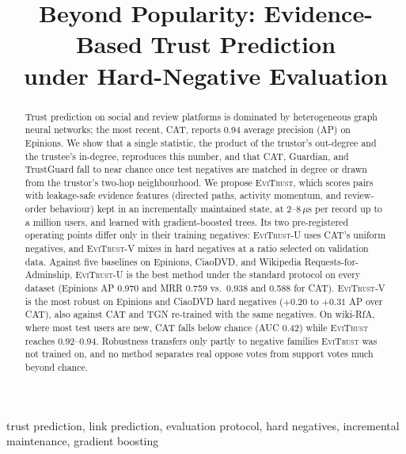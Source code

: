 \documentclass[conference]{IEEEtran}
\newcommand{\evi}{\textsc{EviTrust}}
\newcommand{\eviU}{\textsc{EviTrust}-U}
\newcommand{\eviV}{\textsc{EviTrust}-V}
\begin{document}
\title{Beyond Popularity: Evidence-Based Trust Prediction\\under Hard-Negative Evaluation}

\author{
}

\maketitle

\begin{abstract}
Trust prediction on social and review platforms is dominated by heterogeneous graph neural networks; the most recent, CAT, reports 0.94 average precision (AP) on Epinions. We show that a single statistic, the product of the trustor's out-degree and the trustee's in-degree, reproduces this number, and that CAT, Guardian, and TrustGuard fall to near chance once test negatives are matched in degree or drawn from the trustor's two-hop neighbourhood. We propose \evi{}, which scores pairs with leakage-safe evidence features (directed paths, activity momentum, and review-order behaviour) kept in an incrementally maintained state, at 2--8\,$\mu$s per record up to a million users, and learned with gradient-boosted trees. Its two pre-registered operating points differ only in their training negatives: \eviU{} uses CAT's uniform negatives, and \eviV{} mixes in hard negatives at a ratio selected on validation data. Against five baselines on Epinions, CiaoDVD, and Wikipedia Requests-for-Adminship, \eviU{} is the best method under the standard protocol on every dataset (Epinions AP 0.970 and MRR 0.759 vs.\ 0.938 and 0.588 for CAT). \eviV{} is the most robust on Epinions and CiaoDVD hard negatives ($+0.20$ to $+0.31$ AP over CAT), also against CAT and TGN re-trained with the same negatives. On wiki-RfA, where most test users are new, CAT falls below chance (AUC 0.42) while \evi{} reaches 0.92--0.94. Robustness transfers only partly to negative families \evi{} was not trained on, and no method separates real oppose votes from support votes much beyond chance.
\end{abstract}

\begin{IEEEkeywords}
trust prediction, link prediction, evaluation protocol, hard negatives, incremental maintenance, gradient boosting
\end{IEEEkeywords}

\end{document}
